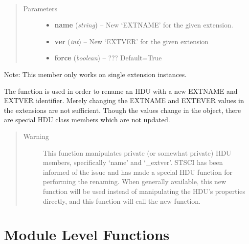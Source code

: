 \documentclass[letterpaper,10pt,english]{sphinxmanual}
\begin{document}
\begin{fulllineitems}
\label{chapter_AstroDataClass:astrodata.data.AstroData.rename_ext}~\begin{quote}\begin{description}
\item[{Parameters}] \leavevmode\begin{itemize}
\item {} 
\textbf{name} (\emph{string}) -- New `EXTNAME' for the given extension.

\item {} 
\textbf{ver} (\emph{int}) -- New `EXTVER' for the given extension

\item {} 
\textbf{force} (\emph{boolean}) -- ???  Default=True

\end{itemize}

\end{description}\end{quote}

Note: This member only works on single extension  instances.

The  function is used in order to rename an HDU with a new
EXTNAME and EXTVER identifier.  Merely changing the EXTNAME and 
EXTEVER values in the extensions  are not sufficient.
Though the values change in the  object, there are special
HDU class members which are not updated.
\begin{quote}\begin{description}
\item[{Warning }] \leavevmode
This function manipulates private (or somewhat private)  HDU
members, specifically `name' and `\_extver'. STSCI has been
informed of the issue and
has made a special HDU function for performing the renaming. 
When generally available, this new function will be used instead of
manipulating the  HDU's properties directly, and this function will 
call the new  function.

\end{description}\end{quote}

\end{fulllineitems}



\section{Module Level Functions}
\label{chapter_AstroDataClass:module-level-functions}
\end{document}
